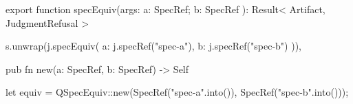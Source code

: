 \begin{tssrc}
export function specEquiv(args: { a: SpecRef; b: SpecRef }): Result<
  Artifact,
  JudgmentRefusal
>
\end{tssrc}
\begin{tssrc}
s.unwrap(j.specEquiv({ a: j.specRef("spec-a"), b: j.specRef("spec-b") })),
\end{tssrc}
\begin{rustsrc}
pub fn new(a: SpecRef, b: SpecRef) -> Self
\end{rustsrc}
\begin{rustsrc}
let equiv = QSpecEquiv::new(SpecRef("spec-a".into()), SpecRef("spec-b".into()));
\end{rustsrc}
